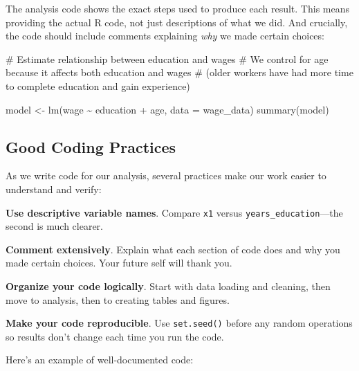 \documentclass[
  letterpaper,
  DIV=11,
  numbers=noendperiod]{scrreprt}
\newenvironment{Shaded}{\begin{snugshade}}{\end{snugshade}}
\newcommand{\AttributeTok}[1]{\textcolor[rgb]{0.40,0.45,0.13}{#1}}
\newcommand{\CommentTok}[1]{\textcolor[rgb]{0.37,0.37,0.37}{#1}}
\newcommand{\FunctionTok}[1]{\textcolor[rgb]{0.28,0.35,0.67}{#1}}
\newcommand{\NormalTok}[1]{\textcolor[rgb]{0.00,0.23,0.31}{#1}}
\newcommand{\OtherTok}[1]{\textcolor[rgb]{0.00,0.23,0.31}{#1}}
\newcommand{\SpecialCharTok}[1]{\textcolor[rgb]{0.37,0.37,0.37}{#1}}
\begin{document}
The analysis code shows the exact steps used to produce each result.
This means providing the actual R code, not just descriptions of what we
did. And crucially, the code should include comments explaining
\emph{why} we made certain choices:

\begin{Shaded}
\begin{Highlighting}[]
\CommentTok{\# Estimate relationship between education and wages}
\CommentTok{\# We control for age because it affects both education and wages}
\CommentTok{\# (older workers have had more time to complete education and gain experience)}

\NormalTok{model }\OtherTok{\textless{}{-}} \FunctionTok{lm}\NormalTok{(wage }\SpecialCharTok{\textasciitilde{}}\NormalTok{ education }\SpecialCharTok{+}\NormalTok{ age, }\AttributeTok{data =}\NormalTok{ wage\_data)}
\FunctionTok{summary}\NormalTok{(model)}
\end{Highlighting}
\end{Shaded}

\subsection{Good Coding Practices}\label{good-coding-practices}

As we write code for our analysis, several practices make our work
easier to understand and verify:

\textbf{Use descriptive variable names}. Compare \texttt{x1} versus
\texttt{years\_education}---the second is much clearer.

\textbf{Comment extensively}. Explain what each section of code does and
why you made certain choices. Your future self will thank you.

\textbf{Organize your code logically}. Start with data loading and
cleaning, then move to analysis, then to creating tables and figures.

\textbf{Make your code reproducible}. Use \texttt{set.seed()} before any
random operations so results don't change each time you run the code.

Here's an example of well-documented code:
\end{document}
